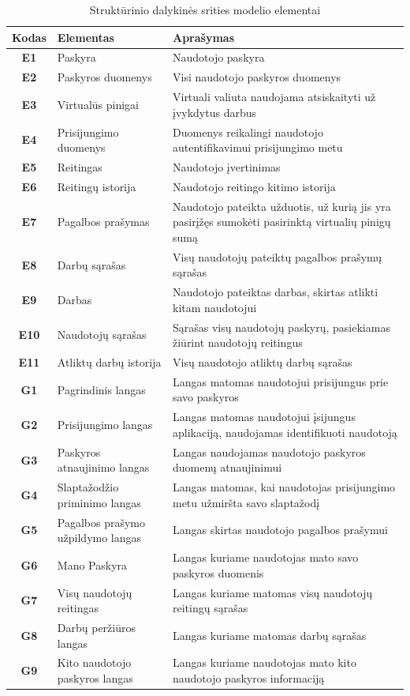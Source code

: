 \documentclass{VUMIFPSbakalaurinis}
\begin{document}
\begin{table}[H]\footnotesize
	\centering
	\caption{Struktūrinio dalykinės srities modelio elementai}
	{
	\setlength{\arrayrulewidth}{0.25mm}
	{\begin{tabular}{|c|m{5.75cm}|m{5.75cm}|} \hline
		Kodas & Elementas & Aprašymas \\
		\hline
		\textbf{E1} & Paskyra & Naudotojo paskyra \\
		\textbf{E2} & Paskyros duomenys & Visi naudotojo paskyros duomenys \\
		\textbf{E3} & Virtualūs pinigai & Virtuali valiuta naudojama atsiskaityti už įvykdytus darbus \\
		\textbf{E4} & Prisijungimo duomenys & Duomenys reikalingi naudotojo autentifikavimui prisijungimo metu \\
		\textbf{E5} & Reitingas & Naudotojo įvertinimas \\
		\textbf{E6} & Reitingų istorija & Naudotojo reitingo kitimo istorija \\
		\textbf{E7} & Pagalbos prašymas & Naudotojo pateikta užduotis, už kurią jis yra pasirįžęs sumokėti pasirinktą virtualių pinigų sumą \\
		\textbf{E8} & Darbų sąrašas & Visų naudotojų pateiktų pagalbos prašymų sąrašas \\
		\textbf{E9} & Darbas & Naudotojo pateiktas darbas, skirtas atlikti kitam naudotojui \\
		\textbf{E10} & Naudotojų sąrašas & Sąrašas visų naudotojų paskyrų, pasiekiamas žiūrint naudotojų reitingus \\
		\textbf{E11} & Atliktų darbų istorija & Visų naudotojo atliktų darbų sąrašas \\
		\hline
		\textbf{G1} & Pagrindinis langas & Langas matomas naudotojui prisijungus prie savo paskyros \\
		\textbf{G2} & Prisijungimo langas & Langas matomas naudotojui įsijungus aplikaciją, naudojamas identifikuoti naudotoją \\
		\textbf{G3} & Paskyros atnaujinimo langas & Langas naudojamas naudotojo paskyros duomenų atnaujinimui \\
		\textbf{G4} & Slaptažodžio priminimo langas & Langas matomas, kai naudotojas prisijungimo metu užmiršta savo slaptažodį \\
		\textbf{G5} & Pagalbos prašymo užpildymo langas & Langas skirtas naudotojo pagalbos prašymui \\
		\textbf{G6} & Mano Paskyra & Langas kuriame naudotojas mato savo paskyros duomenis \\
		\textbf{G7} & Visų naudotojų reitingas & Langas kuriame matomas visų naudotojų reitingų sąrašas \\
		\textbf{G8} & Darbų peržiūros langas & Langas kuriame matomas darbų sąrašas \\
		\textbf{G9} & Kito naudotojo paskyros langas & Langas kuriame naudotojas mato kito naudotojo paskyros informaciją \\
		\hline
	\end{tabular}}
	}
	\label{tab:entity table}
\end{table}
\end{document}
